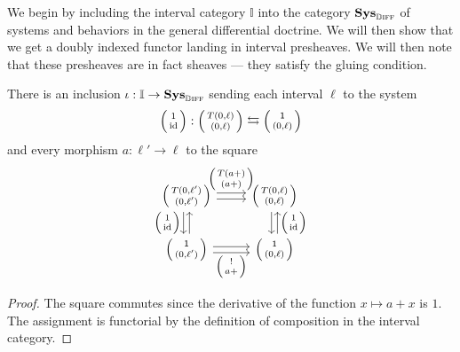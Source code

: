 \documentclass[DynamicalBook]{subfiles}
\begin{document}
  We begin by including the interval category $\mathbb{I}$ into the category $\textbf{Sys}_{\mathbb{D}\textsc{iff}}$ of systems and behaviors in the general differential doctrine. We will then show that we get a doubly indexed functor landing in interval presheaves. We will then note that these presheaves are in fact sheaves --- they satisfy the gluing condition.
  \begin{lemma}
    There is an inclusion $\iota : \mathbb{I} \to \textbf{Sys}_{{\mathbb{D}\textsc{iff}}}$ sending each interval $\ell$ to the system
    $$\lens{1}{\id} : \lens{T(0, \ell)}{(0, \ell)} \fromto \lens{\ord{1}}{(0, \ell)}$$
    and every morphism $a : \ell' \to \ell$ to the square
    \[
    \begin{tikzcd}
      \lens{T(0, \ell')}{(0, \ell')} \ar[r, shift left, "\littlelens{T(a +)}{(a + )}"] \ar[r, shift right] \ar[d, shift right,
      "\littlelens{1}{\id}"'] \ar[d, shift left, leftarrow] &
      \lens{T(0, \ell)}{(0, \ell)} \ar[d, shift left, leftarrow,
      "\littlelens{1}{\id}"] \ar[d, shift right]\\
      \lens{\ord{1}}{(0, \ell')} \ar[r, shift left] \ar[r,
      shift right, "\littlelens{!}{a +}"'] & \lens{\ord{1}}{(0, \ell)}
    \end{tikzcd}
    \]
    \end{lemma}
    \begin{proof}
 The square commutes since the derivative of the function $x \mapsto a + x$ is $1$. The assignment is functorial by the definition of composition in the interval category.
  \end{proof}
\end{document}
